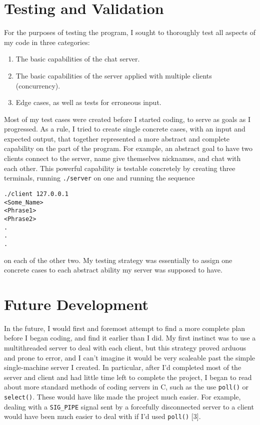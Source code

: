 \documentclass[titlepage, 14pt]{article}
\begin{document}
\newpage

\section{Testing and Validation}
For the purposes of testing the program, I sought to thoroughly test all aspects of my code in three categories:
\begin{enumerate}
\item The basic capabilities of the chat server. 
\item The basic capabilities of the server applied with multiple clients (concurrency).
\item Edge cases, as well as tests for erroneous input.
\end{enumerate}  
Most of my test cases were created before I started coding, to serve as goals as I progressed. As a rule, I tried to create single concrete cases, with an input and expected output, that together represented a more abstract and complete capability on the part of the program. For example, an abstract goal to have two clients connect to the server, name give themselves nicknames, and chat with each other. This powerful capability is testable concretely by creating three terminals, running \verb|./server| on one and running the sequence 
\begin{verbatim} 
./client 127.0.0.1
<Some_Name>
<Phrase1>
<Phrase2>
.
.
.
\end{verbatim}
on each of the other two. My testing strategy was essentially to assign one concrete cases to each abstract ability my server was supposed to have.
\section{Future Development}
In the future, I would first and foremost attempt to find a more complete plan before I began coding, and find it earlier than I did. My first instinct was to use a multithreaded server to deal with each client, but this strategy proved arduous and prone to error, and I can't imagine it would be very scaleable past the simple single-machine server I created. In particular, after I'd completed most of the server and client and had little time left to complete the project, I began to read about more standard methods of coding servers in C, such as the use \verb|poll()| or \verb|select()|. These would have like made the project much easier. For example, dealing with a \verb|SIG_PIPE| signal sent by a forcefully disconnected server to a client would have been much easier to deal with if I'd used \verb|poll()| [3].
\end{document}
